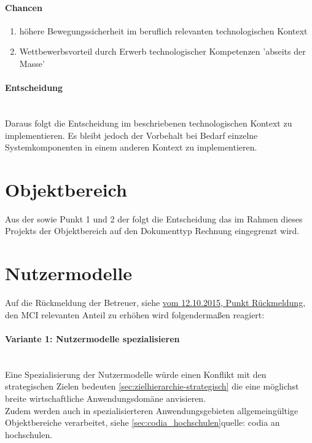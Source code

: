 \paragraph{Chancen}

\begin{enumerate}
\item höhere Bewegungssicherheit im beruflich relevanten technologischen Kontext
\item Wettbewerbsvorteil durch Erwerb technologischer Kompetenzen 'abseits der Masse'
\end{enumerate}

\paragraph{Entscheidung}\\
Daraus folgt die Entscheidung im beschriebenen technologischen Kontext zu implementieren. Es bleibt jedoch der Vorbehalt 
bei Bedarf einzelne Systemkomponenten in einem anderen Kontext zu implementieren.
%
%
\section{Objektbereich}
Aus der  sowie Punkt 1 und 2 der  folgt
die Entscheidung das im Rahmen dieses Projekts der Objektbereich auf den Dokumenttyp Rechnung eingegrenzt wird.


%
\section{Nutzermodelle}
Auf die Rückmeldung der Betreuer, siehe \href{https://github.com/thuascgn/EISWS1516Howe/blob/master/MS1/Sprechstunde_MS1_20151012.md}{vom 12.10.2015, Punkt Rückmeldung}, den MCI relevanten Anteil zu erhöhen wird folgendermaßen reagiert:

%
\paragraph*{Variante 1: Nutzermodelle spezialisieren}\\
Eine Spezialisierung der Nutzermodelle würde einen Konflikt mit den strategischen Zielen bedeuten \ref{sec:zielhierarchie-strategisch} die eine möglichst breite wirtschaftliche Anwendungsdomäne anvisieren.\\
Zudem werden auch in spezialisierteren Anwendungsgebieten allgemeingültige Objektbereiche verarbeitet, siehe \ref{sec:codia_hochschulen}{quelle: codia an hochschulen}.

